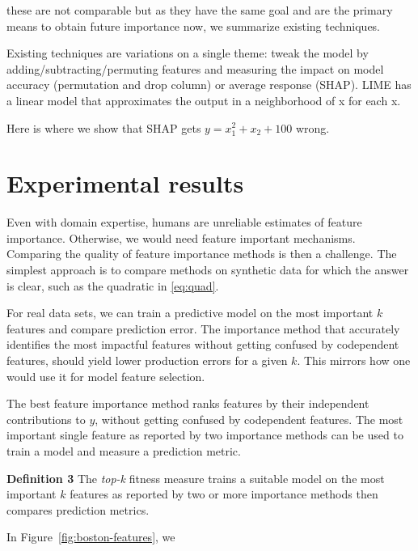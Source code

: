 \documentclass[12pt]{article}
\newcommand{\figref}[1]{Figure~\ref{#1}}
\begin{document}
 these are not comparable but as they have the same goal and are the primary means to obtain future importance now, we summarize existing techniques.
 
Existing techniques are variations on a single theme: tweak the model by adding/subtracting/permuting features and measuring the impact on model accuracy (permutation and drop column) or average response (SHAP). LIME has a linear model that approximates the output in a neighborhood of x for each x.

Here is where we show that SHAP gets $y = x_1^2 + x_2 + 100$ wrong.

\section{Experimental results}

Even with domain expertise, humans are unreliable estimates of feature importance. Otherwise, we would need feature important mechanisms. Comparing the quality of feature importance methods is then a challenge. The simplest approach is to compare methods on synthetic data for which the answer is clear, such as the quadratic in \ref{eq:quad}.

For real data sets, we can train a predictive model on the most important $k$ features and compare prediction error. The importance method that accurately identifies the most impactful features without getting confused by codependent features, should yield lower production errors for a given $k$.   This mirrors how one would use it for model feature selection.
 
The best feature importance method ranks features by their independent contributions to $y$, without getting confused by codependent features. The most important single feature as reported by two importance methods can be used to train a model and measure a prediction metric.
 
{\bf Definition 3} The {\em top-k} fitness measure trains a suitable model on the  most important $k$ features as reported by two or more importance methods then compares prediction metrics.

In \figref{fig:boston-features}, we
\end{document}
